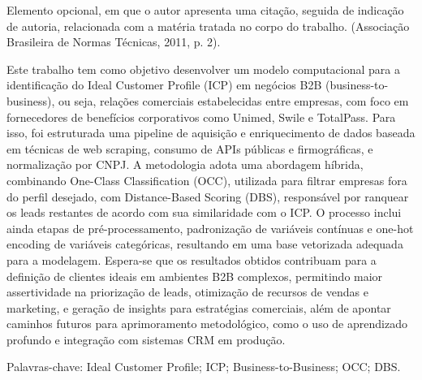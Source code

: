 \documentclass[
        oneside,      %
        english,			
        brazil			 
        ]{abntbibufjf}
\begin{document}

\begin{epigrafemais} %
	Elemento opcional, em que o autor apresenta uma cita\c{c}\~ao, seguida de indica\c{c}\~ao de autoria, relacionada com a                       
  mat\'eria tratada no corpo do trabalho. (Associa\c{c}\~ao Brasileira de Normas T\'ecnicas, 2011, p. 2).
\end{epigrafemais}



\begin{resumo}

  Este trabalho tem como objetivo desenvolver um modelo computacional para a identificação do Ideal Customer Profile (ICP) em negócios B2B (business-to-business), ou seja, relações comerciais estabelecidas entre empresas, com foco em fornecedores de benefícios corporativos como Unimed, Swile e TotalPass. Para isso, foi estruturada uma pipeline de aquisição e enriquecimento de dados baseada em técnicas de web scraping, consumo de APIs públicas e firmográficas, e normalização por CNPJ. A metodologia adota uma abordagem híbrida, combinando One-Class Classification (OCC), utilizada para filtrar empresas fora do perfil desejado, com Distance-Based Scoring (DBS), responsável por ranquear os leads restantes de acordo com sua similaridade com o ICP. O processo inclui ainda etapas de pré-processamento, padronização de variáveis contínuas e one-hot encoding de variáveis categóricas, resultando em uma base vetorizada adequada para a modelagem. Espera-se que os resultados obtidos contribuam para a definição de clientes ideais em ambientes B2B complexos, permitindo maior assertividade na priorização de leads, otimização de recursos de vendas e marketing, e geração de insights para estratégias comerciais, além de apontar caminhos futuros para aprimoramento metodológico, como o uso de aprendizado profundo e integração com sistemas CRM em produção.

  Palavras-chave: Ideal Customer Profile; ICP; Business-to-Business; OCC; DBS.
  
  \end{resumo}
 
\end{document}

